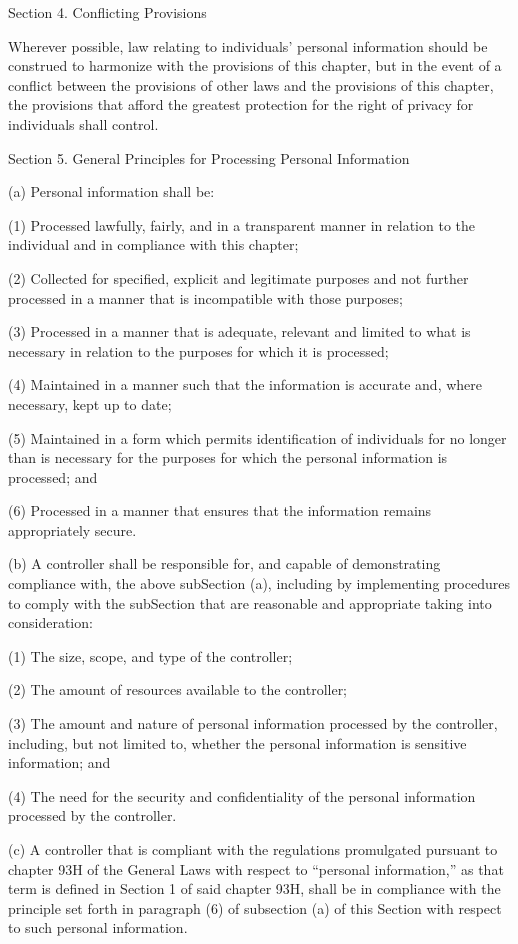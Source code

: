 Section 4. Conflicting Provisions

Wherever possible, law relating to individuals’ personal information should be construed to harmonize with the provisions of this chapter, but in the event of a conflict between the provisions of other laws and the provisions of this chapter, the provisions that afford the greatest protection for the right of privacy for individuals shall control.

Section 5. General Principles for Processing Personal Information 

(a) Personal information shall be:

(1) Processed lawfully, fairly, and in a transparent manner in relation to the individual and in compliance with this chapter;

(2) Collected for specified, explicit and legitimate purposes and not further processed in a manner that is incompatible with those purposes;

(3) Processed in a manner that is adequate, relevant and limited to what is necessary in relation to the purposes for which it is processed;

(4) Maintained in a manner such that the information is accurate and, where necessary, kept up to date;

(5) Maintained in a form which permits identification of individuals for no longer than is necessary for the purposes for which the personal information is processed; and

(6) Processed in a manner that ensures that the information remains appropriately secure.

(b) A controller shall be responsible for, and capable of demonstrating compliance with, the above subSection (a), including by implementing procedures to comply with the subSection that are reasonable and appropriate taking into consideration:

(1) The size, scope, and type of the controller;

(2) The amount of resources available to the controller;

(3) The amount and nature of personal information processed by the controller, including, but not limited to, whether the personal information is sensitive information; and

(4) The need for the security and confidentiality of the personal information processed by the controller. 

(c) A controller that is compliant with the regulations promulgated pursuant to chapter 93H of the General Laws with respect to “personal information,” as that term is defined in Section 1 of said chapter 93H, shall be in compliance with the principle set forth in paragraph (6) of subsection (a) of this Section with respect to such personal information.

